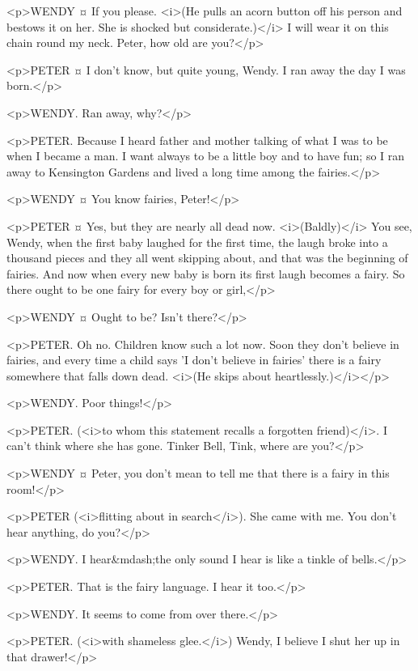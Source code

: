 <p>WENDY ¤
If you please. <i>(He pulls an acorn button off his person and bestows it on her. She is shocked but considerate.)</i> I will wear it on this chain round my neck. Peter, how old are you?</p>

<p>PETER ¤
I don't know, but quite young, Wendy. I ran away the day I was born.</p>

<p>WENDY. Ran away, why?</p>

<p>PETER. Because I heard father and mother talking of what I was to be when I became a man. I want always to be a little boy and to have fun; so I ran away to Kensington Gardens and lived a long time among the fairies.</p>

<p>WENDY ¤
You know fairies, Peter!</p>

<p>PETER ¤
Yes, but they are nearly all dead now. <i>(Baldly)</i> You see, Wendy, when the first baby laughed for the first time, the laugh broke into a thousand pieces and they all went skipping about, and that was the beginning of fairies. And now when every new baby is born its first laugh becomes a fairy. So there ought to be one fairy for every boy or girl,</p>

<p>WENDY ¤
Ought to be? Isn't there?</p>

<p>PETER. Oh no. Children know such a lot now. Soon they don't believe in fairies, and every time a child says 'I don't believe in fairies' there is a fairy somewhere that falls down dead. <i>(He skips about heartlessly.)</i></p>

<p>WENDY. Poor things!</p>

<p>PETER. (<i>to whom this statement recalls a forgotten friend)</i>. I can't think where she has gone. Tinker Bell, Tink, where are you?</p>

<p>WENDY ¤
Peter, you don't mean to tell me that there is a fairy in this room!</p>

<p>PETER (<i>flitting about in search</i>). She came with me. You don't hear anything, do you?</p>

<p>WENDY. I hear&mdash;the only sound I hear is like a tinkle of bells.</p>

<p>PETER. That is the fairy language. I hear it too.</p>

<p>WENDY. It seems to come from over there.</p>

<p>PETER. (<i>with shameless glee.</i>) Wendy, I believe I shut her up in that drawer!</p>

